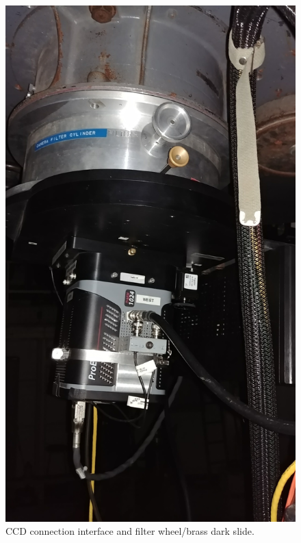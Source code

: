\documentclass[12pt]{article}
\begin{document}
\begin{figure}[t!]
\begin{minipage}[b]{0.49\textwidth}
    \includegraphics[width=\textwidth]{darkslide.jpg}
  \end{minipage}
  \caption{CCD connection interface and filter wheel/brass dark slide.\label{fig:ccd}}
\end{figure}
\end{document}
